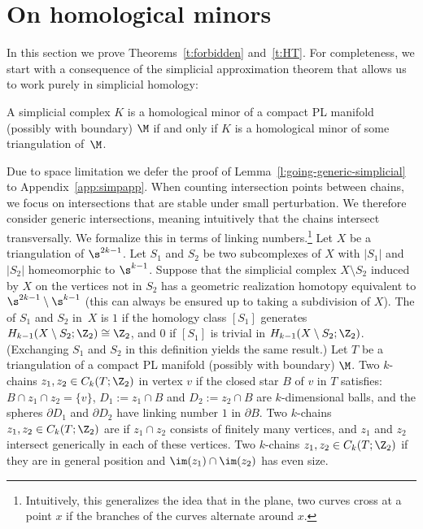 \section{On homological minors}\label{s:toolbox}\label{s:back}
%
In this section we prove Theorems~\ref{t:forbidden} and~\ref{t:HT}. For completeness, we start with a consequence of the simplicial approximation theorem that allows us to work purely in simplicial homology:
%
\begin{lemma}\label{l:going-generic-simplicial}
  A simplicial complex $K$ is a homological minor of a compact PL manifold (possibly with boundary) $\M$ if and only if $K$ is a homological minor of some triangulation of~$\M$.
\end{lemma}
%
\noindent
Due to space limitation we defer the proof of Lemma~\ref{l:going-generic-simplicial} to Appendix~\ref{app:simpapp}.
%
\medskip
%
When counting intersection points between chains, we focus on intersections that are stable under small perturbation. We therefore consider generic intersections, meaning intuitively that the chains intersect transversally. We formalize this in terms of linking numbers.\footnote{Intuitively, this generalizes the idea that in the plane, two curves cross at a point $x$ if the branches of the curves alternate around $x$.}
%
\medskip
%
Let $X$ be a triangulation of $\s^{2k-1}$. Let $S_1$ and $S_2$ be two subcomplexes of $X$ with $|S_1|$ and $|S_2|$ homeomorphic to $\s^{k-1}$. Suppose that the simplicial complex $X \setminus S_2$ induced by $X$ on the vertices not in $S_2$ has a geometric realization homotopy equivalent to $\s^{2k-1}\setminus \s^{k-1}$ (this can always be ensured up to taking a subdivision of $X$). The  of $S_1$ and $S_2$ in~$X$ is $1$ if the homology class $[S_1]$ generates $H_{k-1}(X\setminus S_2;\Z_2)\cong\Z_2$, and $0$ if $[S_1]$ is trivial in $H_{k-1}(X\setminus S_2;\Z_2)$. (Exchanging $S_1$ and $S_2$ in this definition yields the same result.)
%
\medskip
%
Let $T$ be a triangulation of a compact PL manifold (possibly with boundary) $\M$. Two $k$-chains $z_1,z_2\in C_k(T;\Z_2)$  in vertex $v$ if the closed star $B$ of $v$ in $T$ satisfies: $B \cap z_1 \cap z_2 = \{v\}$, $D_1:= z_1 \cap B$ and $D_2:= z_2 \cap B$ are $k$-dimensional balls, and the spheres $\partial D_1$ and $\partial D_2$ have linking number $1$ in $\partial B$. Two $k$-chains $z_1,z_2\in C_k(T;\Z_2)$ are  if $z_1 \cap z_2$ consists of finitely many vertices, and $z_1$ and $z_2$ intersect generically in each of these vertices. Two $k$-chains $z_1,z_2\in C_k(T;\Z_2)$  if they are in general position and $\im(z_1)\cap \im(z_2)$ has even size.

